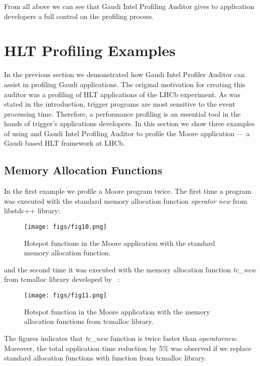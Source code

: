 \documentclass[a4paper]{jpconf}
\begin{document}
From all above we can see that Gaudi Intel Profiling Auditor gives to application developers a full control on the
profiling process.


\section{HLT Profiling Examples}

In the previous section we demonstrated how Gaudi Intel Profiler Auditor can assist  in profiling Gaudi applications. 
The original motivation for creating this auditor was a profiling of HLT applications of the LHCb experiment. 
As was stated in the introduction, trigger programs are most sensitive to the event processing time. 
Therefore, a performance profiling is an essential tool in the hands of trigger's applications developers. 
In this section we show three examples of using \amp and Gaudi Intel Profiling Auditor to profile the Moore 
application --- a Gaudi based HLT framework at LHCb. 

\subsection{Memory Allocation Functions}

In the first example we profile a Moore program twice. The first time a program was executed with the standard memory 
allocation function {\it operator new} from libstdc++ library: 

\begin{figure}[H]
\begin{minipage}{\textwidth}
\texttt{[image: figs/fig10.png]}
\caption{\label{fig10}Hotspot functions in the Moore application with the standard memory allocation function.}
\end{minipage}
\end{figure}

and the second time it was executed with the memory allocation function {\it tc\_new} from tcmalloc library 
developed by \google~\cite{perftools}:
~
\begin{figure}[H]
\begin{minipage}{\textwidth}
\texttt{[image: figs/fig11.png]}
\caption{\label{fig11}Hotspot function in the Moore application with the memory allocation functions from tcmalloc 
library.}
\end{minipage}
\end{figure}

The figures indicates that {\it tc\_new} function is twice faster than {\it operatornew}. Moreover, the total 
application time reduction by 5\% was observed if we replace standard allocation functions with function 
from tcmalloc library.
\end{document}
